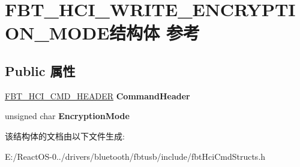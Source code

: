 \hypertarget{struct_f_b_t___h_c_i___w_r_i_t_e___e_n_c_r_y_p_t_i_o_n___m_o_d_e}{}\section{F\+B\+T\+\_\+\+H\+C\+I\+\_\+\+W\+R\+I\+T\+E\+\_\+\+E\+N\+C\+R\+Y\+P\+T\+I\+O\+N\+\_\+\+M\+O\+D\+E结构体 参考}
\label{struct_f_b_t___h_c_i___w_r_i_t_e___e_n_c_r_y_p_t_i_o_n___m_o_d_e}
\subsection*{Public 属性}
\begin{DoxyCompactItemize}
\item 
\mbox{\label{struct_f_b_t___h_c_i___w_r_i_t_e___e_n_c_r_y_p_t_i_o_n___m_o_d_e_a80162a3a67a5628a1468c428fa996be5}} 
\hyperlink{struct_f_b_t___h_c_i___c_m_d___h_e_a_d_e_r}{F\+B\+T\+\_\+\+H\+C\+I\+\_\+\+C\+M\+D\+\_\+\+H\+E\+A\+D\+ER} {\bfseries Command\+Header}
\item 
\mbox{\label{struct_f_b_t___h_c_i___w_r_i_t_e___e_n_c_r_y_p_t_i_o_n___m_o_d_e_acc7fbac9995adf707193ce170bb52f6a}} 
unsigned char {\bfseries Encryption\+Mode}
\end{DoxyCompactItemize}


该结构体的文档由以下文件生成\+:\begin{DoxyCompactItemize}
\item 
E\+:/\+React\+O\+S-\/0../drivers/bluetooth/fbtusb/include/fbt\+Hci\+Cmd\+Structs.\+h\end{DoxyCompactItemize}
